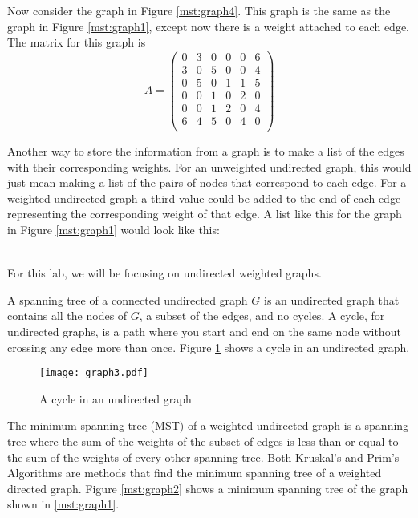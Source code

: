 Now consider the graph in Figure \ref{mst:graph4}.  This graph is the same as the graph in Figure \ref{mst:graph1}, except now there is a weight attached to each edge.  The matrix for this graph is
\[
A = \begin{pmatrix}
0 & 3 & 0 & 0 & 0 & 6\\
3 & 0 & 5 & 0 & 0 & 4\\
0 & 5 & 0 & 1 & 1 & 5\\
0 & 0 & 1 & 0 & 2 & 0\\
0 & 0 & 1 & 2 & 0 & 4\\
6 & 4 & 5 & 0 & 4 & 0\\
\end{pmatrix}
\]

Another way to store the information from a graph is to make a list of the edges with their corresponding weights.
For an unweighted undirected graph, this would just mean making a list of the pairs of nodes that correspond to each edge.
For a weighted undirected graph a third value could be added to the end of each edge representing the corresponding weight of that edge.
A list like this for the graph in Figure \ref{mst:graph1} would look like this:

\begin{align*}
[('A', 'B'),
 ('B', 'C'),
 ('B', 'E'),
 ('B', 'F'),
 ('C', 'D'),\\
 ('C', 'E'),
 ('C', 'F'),
 ('D', 'E'),
 ('E', 'F')]
\end{align*}

For this lab, we will be focusing on undirected weighted graphs.

A spanning tree of a connected undirected graph $G$ is an undirected graph that contains all the nodes of $G$, a subset of the edges, and no cycles.
A cycle, for undirected graphs, is a path where you start and end on the same node without crossing any edge more than once.
Figure \ref{mst:graph3} shows a cycle in an undirected graph.

\begin{figure}[H]
\texttt{[image: graph3.pdf]}
\caption{A cycle in an undirected graph}
\label{mst:graph3}
\end{figure}

The minimum spanning tree (MST) of a weighted undirected graph is a spanning tree where the sum of the weights of the subset of edges is less than or equal to the sum of the weights of every other spanning tree.
Both Kruskal's and Prim's Algorithms are methods that find the minimum spanning tree of a weighted directed graph.
Figure \ref{mst:graph2} shows a minimum spanning tree of the graph shown in \ref{mst:graph1}.

